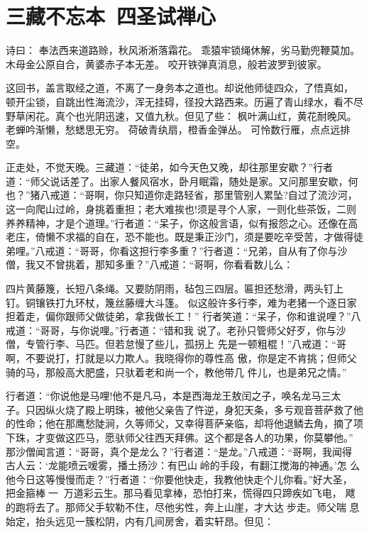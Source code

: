 \chapter{三藏不忘本~四圣试禅心}

诗曰：
奉法西来道路赊，秋风淅淅落霜花。
乖猿牢锁绳休解，劣马勤兜鞭莫加。
木母金公原自合，黄婆赤子本无差。
咬开铁弹真消息，般若波罗到彼家。

这回书，盖言取经之道，不离了一身务本之道也。却说他师徒四众，了悟真如，
顿开尘锁，自跳出性海流沙，浑无挂碍，径投大路西来。历遍了青山绿水，看不尽
野草闲花。真个也光阴迅速，又值九秋。但见了些：
枫叶满山红，黄花耐晚风。
老蝉吟渐懒，愁蟋思无穷。
荷破青纨扇，橙香金弹丛。
可怜数行雁，点点远排空。

正走处，不觉天晚。三藏道：“徒弟，如今天色又晚，却往那里安歇？”行者
道：“师父说话差了。出家人餐风宿水，卧月眠霜，随处是家。又问那里安歇，何
也？”猪八戒道：“哥啊，你只知道你走路轻省，那里管别人累坠?自过了流沙河，
这一向爬山过岭，身挑着重担；老大难挨也!须是寻个人家，一则化些茶饭，二则
养养精神，才是个道理。”行者道：“呆子，你这般言语，似有报怨之心。还像在高
老庄，倚懒不求福的自在，恐不能也。既是秉正沙门，须是要吃辛受苦，才做得徒
弟哩。”八戒道：“哥哥，你看这担行李多重？”行者道：“兄弟，自从有了你与沙
僧，我又不曾挑着，那知多重？”八戒道：“哥啊，你看看数儿么：

四片黄藤篾，长短八条绳。又要防阴雨，毡包三四层。匾担还愁滑，两头钉上
钉。铜镶铁打九环杖，篾丝藤缠大斗篷。
似这般许多行李，难为老猪一个逐日家担着走，偏你跟师父做徒弟，拿我做长工！”
行者笑道：“呆子，你和谁说哩？”八戒道：“哥哥，与你说哩。”行者道：“错和我
说了。老孙只管师父好歹，你与沙僧，专管行李、马匹。但若怠慢了些儿，孤拐上
先是一顿粗棍！”八戒道：“哥啊，不要说打，打就是以力欺人。我晓得你的尊性高
傲，你是定不肯挑；但师父骑的马，那般高大肥盛，只驮着老和尚一个，教他带几
件儿，也是弟兄之情。”

行者道：“你说他是马哩!他不是凡马，本是西海龙王敖闰之子，唤名龙马三太
子。只因纵火烧了殿上明珠，被他父亲告了忤逆，身犯天条，多亏观音菩萨救了他
的性命；他在那鹰愁陡涧，久等师父，又幸得菩萨亲临，却将他退鳞去角，摘了项
下珠，才变做这匹马，愿驮师父往西天拜佛。这个都是各人的功果，你莫攀他。”
那沙僧闻言道：“哥哥，真个是龙么？”行者道：“是龙。”八戒道：“哥啊，我闻得
古人云：‘龙能喷云嗳雾，播土扬沙：有巴山岭的手段，有翻江搅海的神通。’怎
么他今日这等慢慢而走？”行者道：“你要他快走，我教他快走个儿你看。”好大圣，
把金箍棒一，万道彩云生。那马看见拿棒，恐怕打来，慌得四只蹄疾如飞电，
飕的跑将去了。那师父手软勒不住，尽他劣性，奔上山崖，才大达步走。师父喘
息始定，抬头远见一簇松阴，内有几间房舍，着实轩昂。但见：

